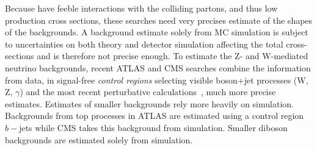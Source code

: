 Because \IP have feeble interactions with the colliding partons, and thus low production cross sections, these searches need very precises estimate of the shapes of the backgrounds.
A background estimate solely from MC simulation is subject to uncertainties on both theory and detector simulation affecting the total cross-sections and is therefore not precise enough.
To estimate the Z- and W-mediated neutrino backgrounds, recent ATLAS and CMS searches combine the information from data, in signal-free \textit{control regions} selecting visible boson+jet processes (W, Z, $\gamma$) and the most recent perturbative calculations~\cite{Lindert:2017olm}, much more precise estimates.
Estimates of smaller backgrounds rely more heavily on simulation.
Backgrounds from top processes in ATLAS are estimated using a control region $b-$jets while CMS takes this background from simulation.
Smaller diboson backgrounds are estimated solely from simulation. 

